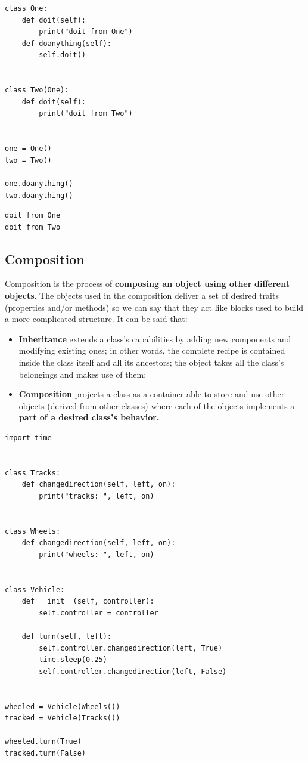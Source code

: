 \documentclass[11pt]{article}
\begin{document}
\begin{verbatim}
class One:
	def doit(self):
		print("doit from One")
	def doanything(self):
		self.doit()


class Two(One):
	def doit(self):
		print("doit from Two")


one = One()
two = Two()

one.doanything()
two.doanything()
\end{verbatim}

\begin{verbatim}
doit from One
doit from Two
\end{verbatim}
\subsection{Composition}
\label{sec:orgfbeab50}
Composition is the process of \textbf{composing an object using other}
\textbf{different objects}. The objects used in the composition deliver a set
of desired traits (properties and/or methods) so we can say that they
act like blocks used to build a more complicated structure.
It can be said that:

\begin{itemize}
\item \textbf{Inheritance} extends a class’s capabilities by adding new
components and modifying existing ones; in other words, the complete
recipe is contained inside the class itself and all its ancestors;
the object takes all the class’s belongings and makes use of them;
\item \textbf{Composition} projects a class as a container able to store and use
other objects (derived from other classes) where each of the objects
implements a \textbf{part of a desired class’s behavior.}
\end{itemize}

\begin{verbatim}
import time


class Tracks:
	def changedirection(self, left, on):
		print("tracks: ", left, on)


class Wheels:
	def changedirection(self, left, on):
		print("wheels: ", left, on)


class Vehicle:
	def __init__(self, controller):
		self.controller = controller

	def turn(self, left):
		self.controller.changedirection(left, True)
		time.sleep(0.25)
		self.controller.changedirection(left, False)


wheeled = Vehicle(Wheels())
tracked = Vehicle(Tracks())

wheeled.turn(True)
tracked.turn(False)

\end{verbatim}
\end{document}
